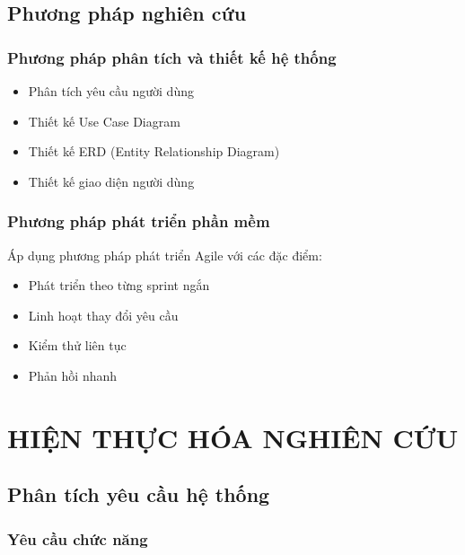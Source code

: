 \documentclass[12pt,a4paper]{report}
\begin{document}
\section{Phương pháp nghiên cứu}

\subsection{Phương pháp phân tích và thiết kế hệ thống}

\begin{itemize}
    \item Phân tích yêu cầu người dùng
    \item Thiết kế Use Case Diagram
    \item Thiết kế ERD (Entity Relationship Diagram)
    \item Thiết kế giao diện người dùng
\end{itemize}

\subsection{Phương pháp phát triển phần mềm}

Áp dụng phương pháp phát triển Agile với các đặc điểm:
\begin{itemize}
    \item Phát triển theo từng sprint ngắn
    \item Linh hoạt thay đổi yêu cầu
    \item Kiểm thử liên tục
    \item Phản hồi nhanh
\end{itemize}

\newpage

\chapter{HIỆN THỰC HÓA NGHIÊN CỨU}

\section{Phân tích yêu cầu hệ thống}

\subsection{Yêu cầu chức năng}
\end{document}
